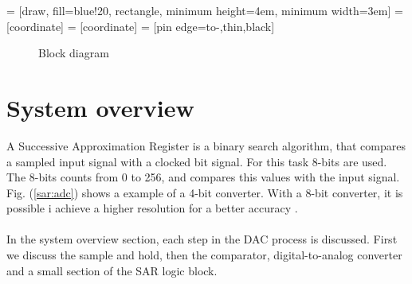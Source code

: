 \documentclass[english, 12pt, a4paper]{ifimaster}
\begin{document}
 = [draw, fill=blue!20, rectangle, 
    minimum height=4em, minimum width=3em]
 = [coordinate]
 = [coordinate]
 = [pin edge={to-,thin,black}]
\begin{figure}[!ht]
  \caption{Block diagram}
  \label{block_diagram}
\end{figure}
\section{System overview}
A Successive Approximation Register is a binary search algorithm, that compares a sampled input signal with a clocked bit signal. For this task 8-bits are used. The 8-bits counts from 0 to 256, and 
compares this values with the input signal. Fig. (\ref{sar:adc}) shows a example of a 4-bit converter. 
With a 8-bit converter, it is possible i achieve a higher resolution for a better accuracy \cite{sar-adc-concept}.\\
\\
In the system overview section, each step in the DAC process is discussed. First we discuss the sample and hold, then the comparator, digital-to-analog converter and a small section of 
the SAR logic block. 
\end{document}
